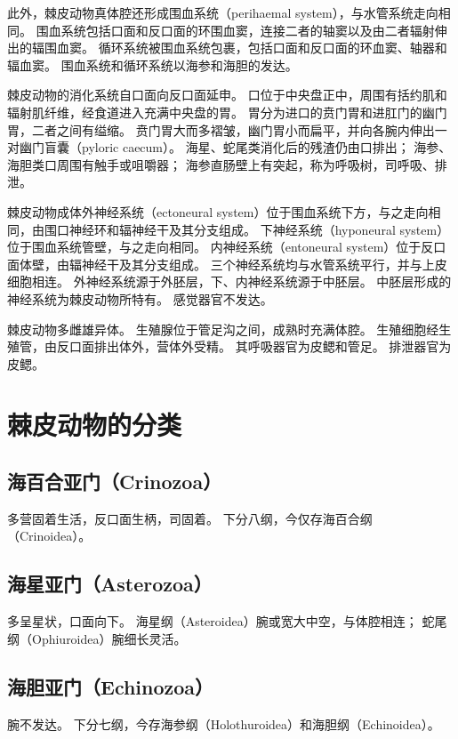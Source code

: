 \documentclass[11pt]{article}
\begin{document}
\newline

此外，棘皮动物真体腔还形成围血系统（perihaemal system），与水管系统走向相同。
围血系统包括口面和反口面的环围血窦，连接二者的轴窦以及由二者辐射伸出的辐围血窦。
循环系统被围血系统包裹，包括口面和反口面的环血窦、轴器和辐血窦。
围血系统和循环系统以海参和海胆的发达。

\newline

棘皮动物的消化系统自口面向反口面延申。
口位于中央盘正中，周围有括约肌和辐射肌纤维，经食道进入充满中央盘的胃。
胃分为进口的贲门胃和进肛门的幽门胃，二者之间有缢缩。
贲门胃大而多褶皱，幽门胃小而扁平，并向各腕内伸出一对幽门盲囊（pyloric caecum）。
海星、蛇尾类消化后的残渣仍由口排出；
海参、海胆类口周围有触手或咀嚼器；
海参直肠壁上有突起，称为呼吸树，司呼吸、排泄。

\newline

棘皮动物成体外神经系统（ectoneural system）位于围血系统下方，与之走向相同，由围口神经环和辐神经干及其分支组成。
下神经系统（hyponeural system）位于围血系统管壁，与之走向相同。
内神经系统（entoneural system）位于反口面体壁，由辐神经干及其分支组成。
三个神经系统均与水管系统平行，并与上皮细胞相连。
外神经系统源于外胚层，下、内神经系统源于中胚层。
中胚层形成的神经系统为棘皮动物所特有。
感觉器官不发达。

\newline

棘皮动物多雌雄异体。
生殖腺位于管足沟之间，成熟时充满体腔。
生殖细胞经生殖管，由反口面排出体外，营体外受精。
其呼吸器官为皮鳃和管足。
排泄器官为皮鳃。
  
\section{棘皮动物的分类}
\subsection{海百合亚门（Crinozoa）}
多营固着生活，反口面生柄，司固着。
下分八纲，今仅存海百合纲（Crinoidea）。
  
\subsection{海星亚门（Asterozoa）}
多呈星状，口面向下。
海星纲（Asteroidea）腕或宽大中空，与体腔相连；
蛇尾纲（Ophiuroidea）腕细长灵活。
  
\subsection{海胆亚门（Echinozoa）}
腕不发达。
下分七纲，今存海参纲（Holothuroidea）和海胆纲（Echinoidea）。
\end{document}
